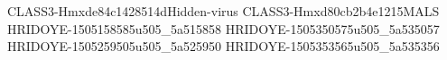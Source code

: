 CLASS3-Hmxde84c1428514dHidden-virus
CLASS3-Hmxd80cb2b4e1215MALS
HRIDOYE-1505158585u505_5a515858
HRIDOYE-1505350575u505_5a535057
HRIDOYE-1505259505u505_5a525950
HRIDOYE-1505353565u505_5a535356
